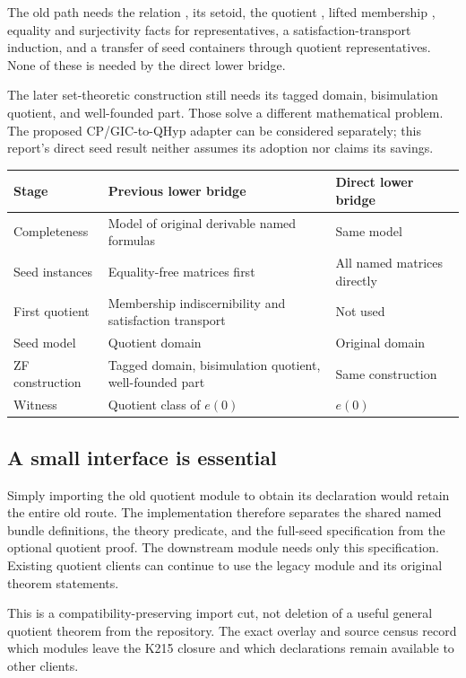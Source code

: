 \documentclass[11pt,letterpaper]{article}
\theoremstyle{definition}
\theoremstyle{remark}
\newcommand{\code}[1]{\texttt{\detokenize{#1}}}
\begin{document}
The old path needs the relation \code{Ind}, its setoid, the quotient
\code{IndQ}, lifted membership \code{qmem}, equality and surjectivity facts for
representatives, a satisfaction-transport induction, and a transfer of seed
containers through quotient representatives. None of these is needed by the
direct lower bridge.

The later set-theoretic construction still needs its tagged domain, bisimulation
quotient, and well-founded part. Those solve a different mathematical problem.
The proposed CP/GIC-to-QHyp adapter can be considered separately; this report's
direct seed result neither assumes its adoption nor claims its savings.

\begin{center}
\begin{tabularx}{\textwidth}{@{}p{}XX@{}}
\toprule
Stage & Previous lower bridge & Direct lower bridge \\
\midrule
Completeness & Model of original derivable named formulas & Same model \\
Seed instances & Equality-free matrices first & All named matrices directly \\
First quotient & Membership indiscernibility and satisfaction transport & Not used \\
Seed model & Quotient domain & Original domain \\
ZF construction & Tagged domain, bisimulation quotient, well-founded part & Same construction \\
Witness & Quotient class of \(e(0)\) & \(e(0)\) \\
\bottomrule
\end{tabularx}
\end{center}

\subsection{A small interface is essential}

Simply importing the old quotient module to obtain its \code{FullSeed} declaration
would retain the entire old route. The implementation therefore separates the
shared named bundle definitions, the theory predicate, and the full-seed
specification from the optional quotient proof. The downstream
\code{KLowerSeed} module needs only this specification. Existing quotient clients
can continue to use the legacy module and its original theorem statements.

This is a compatibility-preserving import cut, not deletion of a useful general
quotient theorem from the repository. The exact overlay and source census record
which modules leave the K215 closure and which declarations remain available to
other clients.
\end{document}

